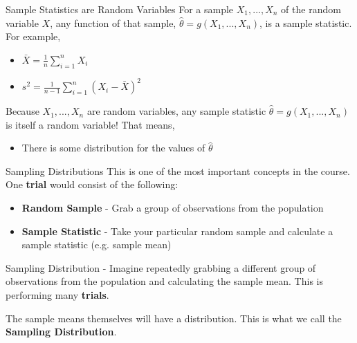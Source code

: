 \documentclass{beamer}
\begin{document}
\begin{frame}{Sample Statistics are Random Variables}
	For a sample $X_1,..., X_n$ of the random variable $X$, any function of that sample, $\hat{\theta}=g(X_1,...,X_n)$, is a \alert{sample statistic}.  For example,
	\begin{itemize}
		\item $\displaystyle\bar{X} = \frac{1}{n} \sum_{i=1}^{n} X_i$
		\item $\displaystyle s^2 = \frac{1}{n-1} \sum_{i=1}^{n} (X_i - \bar{X})^2$ 
	\end{itemize}
	
	Because $X_1,..., X_n$ are random variables, any sample statistic $\hat{\theta}=g(X_1,...,X_n)$ is itself a random variable!  That means,

	\begin{itemize}
		\item There is some distribution for the values of $\hat{\theta}$
	\end{itemize}
\end{frame}

\begin{frame}{Sampling Distributions}
	This is one of the most important concepts in the course. One \textbf{trial} would consist of the following:

	\begin{itemize}
		\item \textbf{Random Sample} - Grab a group of observations from the population 
		
		\item \textbf{Sample Statistic} - Take your particular random sample and calculate a sample statistic (e.g. sample mean)

	\end{itemize}
	
	\alert{Sampling Distribution} - Imagine repeatedly grabbing a different group of observations from the population and calculating the sample mean. This is performing many \textbf{trials}.

	The sample means themselves will have a distribution. This is what we call the \textbf{Sampling Distribution}.
\end{frame}
\end{document}
